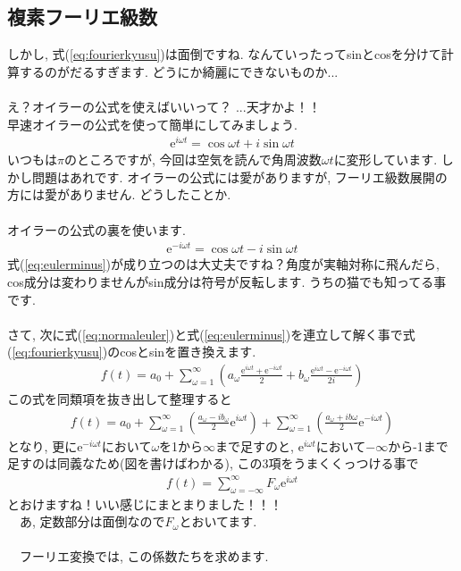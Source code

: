 \documentclass[11pt,a4paper,uplatex]{ujreport} 	%
\begin{document}
\subsection{複素フーリエ級数}
しかし, 式(\ref{eq:fourierkyusu})は面倒ですね. なんていったってsinとcosを分けて計算するのがだるすぎます. どうにか綺麗にできないものか...\\
\\
え？オイラーの公式を使えばいいって？ ...天才かよ！！
\\
早速オイラーの公式を使って簡単にしてみましょう. 
\begin{eqnarray}
\mathrm{e}^{i\omega t} = \cos\omega t + i\sin\omega t
\label{eq:normaleuler}
\end{eqnarray}
いつもは$\pi$のところですが, 今回は空気を読んで角周波数$\omega t$に変形しています. しかし問題はあれです. オイラーの公式には愛がありますが, フーリエ級数展開の方には愛がありません. どうしたことか.\\
\\
オイラーの公式の裏を使います.
\begin{eqnarray}
\mathrm{e}^{-i\omega t} = \cos\omega t - i\sin\omega t
\label{eq:eulerminus}
\end{eqnarray}
式(\ref{eq:eulerminus})が成り立つのは大丈夫ですね？角度が実軸対称に飛んだら, cos成分は変わりませんがsin成分は符号が反転します. うちの猫でも知ってる事です.\\
\\
さて, 次に式(\ref{eq:normaleuler})と式(\ref{eq:eulerminus})を連立して解く事で式(\ref{eq:fourierkyusu})のcosとsinを置き換えます. \\
\begin{eqnarray}
f(t) = a_0 + \sum_{\omega=1}^\infty {(a_\omega \frac{\mathrm{e}^{i\omega t}+\mathrm{e}^{-i\omega t}}{2} + b_\omega \frac{\mathrm{e}^{i\omega t} - \mathrm{e}^{-i\omega t}}{2i})}
\label{eq:complexfourier}
\end{eqnarray}
この式を同類項を抜き出して整理すると
\begin{eqnarray}
f(t) = a_0 + \sum_{\omega=1}^\infty {(\frac{a_\omega - ib_\omega}{2}\mathrm{e}^{i\omega t})} + \sum_{\omega=1}^\infty {(\frac{a_\omega + ib\omega}{2}\mathrm{e}^{-i\omega t})}
\label{eq:complexfourierkai}
\end{eqnarray}
となり, 更に$\mathrm{e}^{-i\omega t}$において$\omega$を1から$\infty$まで足すのと, $\mathrm{e}^{i\omega t}$において$-\infty$から-1まで足すのは同義なため(図を書けばわかる), この3項をうまくくっつける事で
\begin{eqnarray}
f(t) = \sum_{\omega = -\infty}^\infty F_\omega \mathrm{e}^{i\omega t}
\end{eqnarray}
とおけますね！いい感じにまとまりました！！！\\
　あ, 定数部分は面倒なので$F_\omega$とおいてます. \\
\\
　フーリエ変換では, この係数たちを求めます. 
\end{document}
